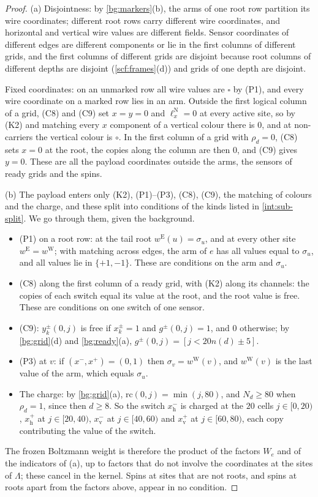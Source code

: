 \begin{proof}
(a) Disjointness: by \cref{bg:markers}(b), the arms of one root row partition its wire coordinates; different root rows carry different wire coordinates, and horizontal and vertical wire values are different fields. Sensor coordinates of different edges are different components or lie in the first columns of different grids, and the first columns of different grids are disjoint because root columns of different depths are disjoint (\cref{scf:frames}(d)) and grids of one depth are disjoint.

Fixed coordinates: on an unmarked row all wire values are $\square$ by (P1), and every wire coordinate on a marked row lies in an arm. Outside the first logical column of a grid, (C8) and (C9) set $x=y=0$ and $\ell^{\mathrm N}_x=0$ at every active site, so by (K2) and matching every $x$ component of a vertical colour there is $0$, and at non-carriers the vertical colour is $\circ$. In the first column of a grid with $\rho_d=0$, (C8) sets $x=0$ at the root, the copies along the column are then $0$, and (C9) gives $y=0$. These are all the payload coordinates outside the arms, the sensors of ready grids and the spins.

(b) The payload enters only (K2), (P1)--(P3), (C8), (C9), the matching of colours and the charge, and these split into conditions of the kinds listed in \cref{int:sub-split}. We go through them, given the background.
\begin{itemize}
\item (P1) on a root row: at the tail root $w^{\mathrm E}(u)=\sigma_u$, and at every other site $w^{\mathrm E}=w^{\mathrm W}$; with matching across edges, the arm of $e$ has all values equal to $\sigma_u$, and all values lie in $\{+1,-1\}$. These are conditions on the arm and $\sigma_u$.
\item (C8) along the first column of a ready grid, with (K2) along its channels: the copies of each switch equal its value at the root, and the root value is free. These are conditions on one switch of one sensor.
\item (C9): $y^\pm_k(0,j)$ is free if $x^\pm_k=1$ and $g^\pm(0,j)=1$, and $0$ otherwise; by \cref{bg:grid}(d) and \cref{bg:ready}(a), $g^\pm(0,j)=[j<20n(d)\pm5]$.
\item (P3) at $v$: if $(x^-,x^+)=(0,1)$ then $\sigma_v=w^{\mathrm W}(v)$, and $w^{\mathrm W}(v)$ is the last value of the arm, which equals $\sigma_u$.
\item The charge: by \cref{bg:grid}(a), $\mathrm{rc}(0,j)=\min(j,80)$, and $N_d\ge80$ when $\rho_d=1$, since then $d\ge8$. So the switch $x^-_{\mathrm h}$ is charged at the $20$ cells $j\in[0,20)$, $x^+_{\mathrm h}$ at $j\in[20,40)$, $x^-_{\mathrm v}$ at $j\in[40,60)$ and $x^+_{\mathrm v}$ at $j\in[60,80)$, each copy contributing the value of the switch.
\end{itemize}
The frozen Boltzmann weight is therefore the product of the factors $W_e$ and of the indicators of (a), up to factors that do not involve the coordinates at the sites of $\Lambda$; these cancel in the kernel. Spins at sites that are not roots, and spins at roots apart from the factors above, appear in no condition.
\end{proof}

